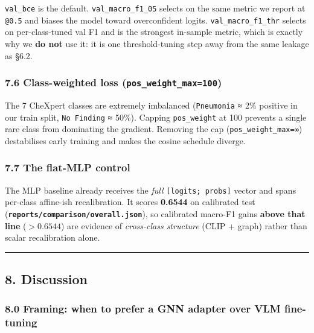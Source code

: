 \documentclass[
  11pt,
]{article}
\begin{document}
\texttt{val\_bce} is the default. \texttt{val\_macro\_f1\_05} selects on
the same metric we report at \texttt{@0.5} and biases the model toward
overconfident logits. \texttt{val\_macro\_f1\_thr} selects on
per-class-tuned val F1 and is the strongest in-sample metric, which is
exactly why we \textbf{do not} use it: it is one threshold-tuning step
away from the same leakage as §6.2.

\subsubsection{\texorpdfstring{7.6 Class-weighted loss
(\texttt{pos\_weight\_max=100})}{7.6 Class-weighted loss (pos\_weight\_max=100)}}\label{class-weighted-loss-pos_weight_max100}

The 7 CheXpert classes are extremely imbalanced (\texttt{Pneumonia} ≈
2\% positive in our train split, \texttt{No\ Finding} ≈ 50\%). Capping
\texttt{pos\_weight} at 100 prevents a single rare class from dominating
the gradient. Removing the cap (\texttt{pos\_weight\_max=∞})
destabilises early training and makes the cosine schedule diverge.

\subsubsection{7.7 The flat-MLP control}\label{the-flat-mlp-control}

The MLP baseline already receives the \emph{full}
\texttt{{[}logits;\ probs{]}} vector and spans per-class affine-ish
recalibration. It scores \textbf{0.6544} on calibrated test
(\textbf{\texttt{reports/comparison/overall.json}}), so calibrated
macro-F1 gains \textbf{above that line} (\(>0.6544\)) are evidence of
\emph{cross-class structure} (CLIP + graph) rather than scalar
recalibration alone.

\begin{center}\rule{0.5\linewidth}{0.5pt}\end{center}

\subsection{8. Discussion}\label{discussion}

\subsubsection{8.0 Framing: when to prefer a GNN adapter over VLM
fine-tuning}\label{framing-when-to-prefer-a-gnn-adapter-over-vlm-fine-tuning}
\end{document}
